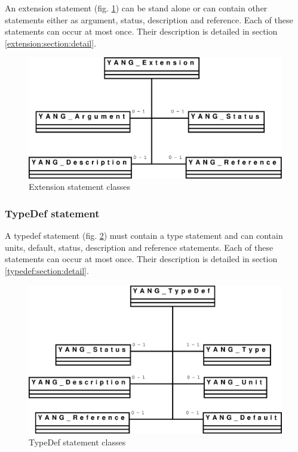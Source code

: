 \documentclass[a4paper]{article}
\begin{document}
An extension  statement (fig.  \ref{extension}) can be  stand alone or
can contain  other statements either as  argument, status, description
and  reference.  Each  of these  statements  can occur  at most  once.
Their       description       is       detailed       in       section
\ref{extension:section:detail}.

\begin{figure}[htbp]
\begin{center}
\includegraphics[scale = .3]{extension.eps}
\end{center}
\caption{Extension statement classes}
\label{extension}
\end{figure}

\subsubsection{TypeDef statement}
\label{typedef:section:global}

A  typedef  statement  (fig.    \ref{typedef})  must  contain  a  type
statement  and can  contain  units, default,  status, description  and
reference  statements.  Each  of these  statements can  occur  at most
once.      Their     description     is    detailed     in     section
\ref{typedef:section:detail}.
\begin{figure}[htbp]
\begin{center}
\includegraphics[scale = .3]{typedef.eps}
\end{center}
\caption{TypeDef statement classes}
\label{typedef}
\end{figure}
\end{document}
